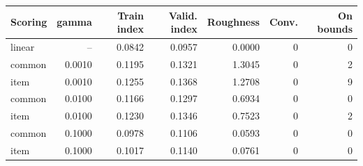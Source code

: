 \begin{tabular}{lrrrrrr}
\toprule
Scoring & gamma & Train index & Valid. index & Roughness & Conv. & On bounds \\
\midrule
linear & -- & 0.0842 & 0.0957 & 0.0000 & 0 & 0 \\
common & 0.0010 & 0.1195 & 0.1321 & 1.3045 & 0 & 2 \\
item & 0.0010 & 0.1255 & 0.1368 & 1.2708 & 0 & 9 \\
common & 0.0100 & 0.1166 & 0.1297 & 0.6934 & 0 & 0 \\
item & 0.0100 & 0.1230 & 0.1346 & 0.7523 & 0 & 2 \\
common & 0.1000 & 0.0978 & 0.1106 & 0.0593 & 0 & 0 \\
item & 0.1000 & 0.1017 & 0.1140 & 0.0761 & 0 & 0 \\
\bottomrule
\end{tabular}
